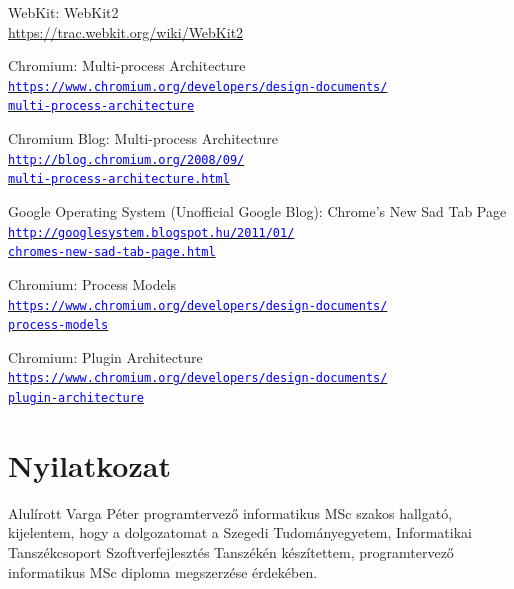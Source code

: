 \documentclass[12pt]{report}
\let\orighref\href
\renewcommand{\href}[2]{%
    \orighref{#1}{\textcolor{blue}{\texttt{#2}}}
}
\let\origurl\url
\renewcommand{\url}[1]{%
    \textcolor{blue}{\origurl{#1}}
}
\begin{document}
\begin{thebibliography}{9}
        WebKit: WebKit2 \\
        \url{https://trac.webkit.org/wiki/WebKit2}

        Chromium: Multi-process Architecture \\
        \href{https://www.chromium.org/developers/design-documents/multi-process-architecture}
        {https://www.chromium.org/developers/design-documents/\\
        multi-process-architecture}

        Chromium Blog: Multi-process Architecture \\
        \href{http://blog.chromium.org/2008/09/multi-process-architecture.html}
        {http://blog.chromium.org/2008/09/\\
        multi-process-architecture.html}

        Google Operating System (Unofficial Google Blog): Chrome's New Sad Tab Page \\
        \href{http://googlesystem.blogspot.hu/2011/01/chromes-new-sad-tab-page.html}
        {http://googlesystem.blogspot.hu/2011/01/\\
        chromes-new-sad-tab-page.html}

        Chromium: Process Models \\
        \href{https://www.chromium.org/developers/design-documents/process-models}
        {https://www.chromium.org/developers/design-documents/\\
        process-models}

        Chromium: Plugin Architecture \\
        \href{https://www.chromium.org/developers/design-documents/plugin-architecture}
        {https://www.chromium.org/developers/design-documents/\\
        plugin-architecture}

\end{thebibliography}


\chapter*{Nyilatkozat}

\noindent
Alulírott Varga Péter programtervező informatikus MSc szakos hallgató, kijelentem, hogy a
dolgozatomat a Szegedi Tudományegyetem, Informatikai Tanszékcsoport Szoftverfejlesztés
Tanszékén készítettem, programtervező informatikus MSc diploma megszerzése érdekében.
\end{document}
